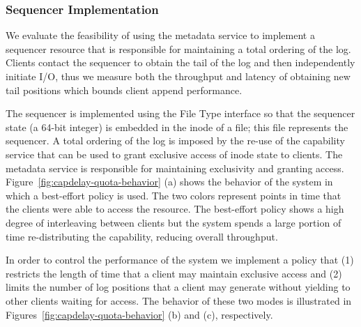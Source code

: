 \subsubsection{Sequencer Implementation}
\label{sec:sequencer-implementation}

We evaluate the feasibility of using the metadata service to implement a
sequencer resource that is responsible for maintaining a total ordering of the
log. Clients contact the sequencer to obtain the tail of the log and then
independently initiate I/O, thus we measure both the throughput and latency of
obtaining new tail positions which bounds client append performance.

The sequencer is implemented using the File Type interface so that the sequencer state
(a 64-bit integer) is embedded in the inode of a file; this file represents the
sequencer. A total ordering of the log is imposed by the re-use of the
capability service that can be used to grant exclusive access of inode state to
clients. The metadata service is responsible for maintaining exclusivity and
granting access. Figure~\ref{fig:capdelay-quota-behavior} (a) shows the
behavior of the system in which a best-effort policy is used.  The two colors
represent points in time that the clients were able to access the resource.
The best-effort policy shows a high degree of interleaving between clients but
the system spends a large portion of time re-distributing the capability,
reducing overall throughput.

In order to control the performance of the system we implement a policy that
(1) restricts the length of time that a client may maintain exclusive access
and (2) limits the number of log positions that a client may generate without
yielding to other clients waiting for access. The behavior of these two modes
is illustrated in Figures~\ref{fig:capdelay-quota-behavior} (b) and (c),
respectively.


